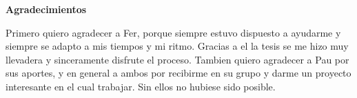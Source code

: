 \newenvironment{agradecimientos}%
{\thispagestyle{empty} \cleardoublepage\null \thispagestyle{empty} \vfill\begin{center}%
\textbf{Agradecimientos} \end{center}}%
{\thispagestyle{empty} \vfill\null }

\begin{agradecimientos}
Primero quiero agradecer a Fer, porque siempre estuvo dispuesto a ayudarme y siempre se adapto a mis tiempos y mi ritmo. Gracias a el la tesis se me hizo muy llevadera y sinceramente disfrute el proceso. Tambien quiero agradecer a Pau por sus aportes, y en general a ambos por recibirme en su grupo y darme un proyecto interesante en el cual trabajar. Sin ellos no hubiese sido posible.



\end{agradecimientos}
%
%
% 
\null